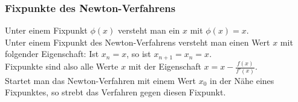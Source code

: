 \subsubsection{Fixpunkte des Newton-Verfahrens}
Unter einem Fixpunkt $\phi (x)$ versteht man ein $x$ mit $\phi (x) = x$. \\
Unter einem Fixpunkt des Newton-Verfahrens versteht man einen Wert $x$ mit folgender Eigenschaft: Ist $x_n = x$, so ist $x_{n+1} = x_n = x$. \\
Fixpunkte sind also alle Werte $x$ mit der Eigenschaft $x=x-\frac{f(x)}{f'(x)}$. \\
Startet man das Newton-Verfahren mit einem Wert $x_0$ in der Nähe eines Fixpunktes, so strebt das Verfahren gegen diesen Fixpunkt.